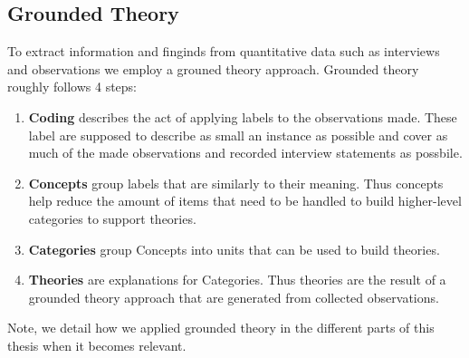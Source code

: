 \subsection{Grounded Theory}
To extract information and finginds from quantitative data such as interviews and observations we employ a grouned theory approach.
Grounded theory roughly follows 4 steps:
 
\begin{enumerate}
\item\textbf{Coding} describes the act of applying labels to the observations made.
These label are supposed to describe as small an instance as possible and cover as much of the made observations and recorded interview statements as possbile.
\item\textbf{Concepts} group labels that are similarly to their meaning.
Thus concepts help reduce the amount of items that need to be handled to build higher-level categories to support theories.
\item\textbf{Categories} group Concepts into units that can be used to build theories.
\item\textbf{Theories} are explanations for Categories.
Thus theories are the result of a grounded theory approach that are generated from collected observations.
\end{enumerate}

Note, we detail how we applied grounded theory in the different parts of this thesis when it becomes relevant.










